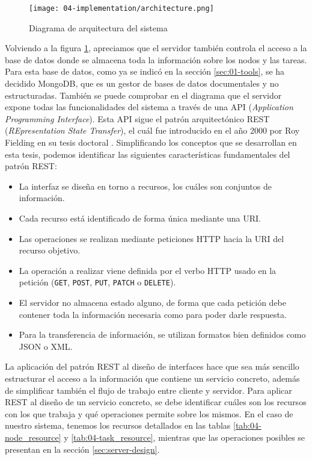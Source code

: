 \begin{figure}
    \centering
    \texttt{[image: 04-implementation/architecture.png]}
    \caption{Diagrama de arquitectura del sistema}
    \label{fig:04-architecture}
\end{figure}

Volviendo a la figura \ref{fig:04-architecture}, apreciamos que el servidor
también controla el acceso a la base de datos donde se almacena toda la
información sobre los nodos y las tareas. Para esta base de datos, como ya se
indicó en la sección \ref{sec:01-tools}, se ha decidido MongoDB, que es un gestor
de bases de datos documentales y no estructuradas. También se puede comprobar en
el diagrama que el servidor expone todas las funcionalidades del sistema a
través de una API (\textit{Application Programming Interface}). Esta API sigue
el patrón arquitectónico REST (\textit{REpresentation State Transfer}), el cuál
fue introducido en el año 2000 por Roy Fielding en su tesis doctoral
\cite{fielding_architectural_2000}. Simplificando los conceptos que se
desarrollan en esta tesis, podemos identificar las siguientes características
fundamentales del patrón REST:

\begin{itemize}
    \item La interfaz se diseña en torno a recursos, los cuáles son conjuntos de
          información.
    \item Cada recurso está identificado de forma única mediante una URI.
    \item Las operaciones se realizan mediante peticiones HTTP hacia la URI del
          recurso objetivo.
    \item La operación a realizar viene definida por el verbo HTTP usado en la
          petición (\texttt{GET}, \texttt{POST}, \texttt{PUT}, \texttt{PATCH} o
          \texttt{DELETE}).
    \item El servidor no almacena estado alguno, de forma que cada petición debe
          contener toda la información necesaria como para poder darle respuesta.
    \item Para la transferencia de información, se utilizan formatos bien
          definidos como JSON o XML.
\end{itemize}

La aplicación del patrón REST al diseño de interfaces hace que sea más sencillo
estructurar el acceso a la información que contiene un servicio concreto, además
de simplificar también el flujo de trabajo entre cliente y servidor. Para
aplicar REST al diseño de un servicio concreto, se debe identificar cuáles son
los recursos con los que trabaja y qué operaciones permite sobre los mismos. En
el caso de nuestro sistema, tenemos los recursos detallados en las tablas
\ref{tab:04-node_resource} y \ref{tab:04-task_resource}, mientras que las
operaciones posibles se presentan en la sección \ref{sec:server-design}.

